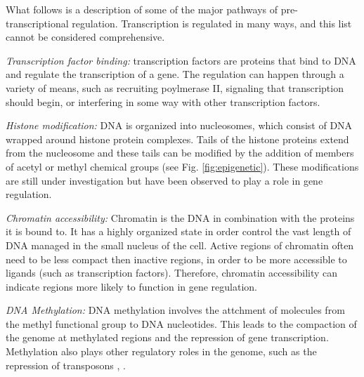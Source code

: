 \documentclass{frontiersENG} %
\begin{document}
\begin{tcolorbox}[title=Box 1 | Pathways of Pre-Transcriptional Regulation]
  \setlength{\parskip}{.5em}
  \label{box:regpathways}

  What follows is a description of some of the major pathways of
  pre-transcriptional regulation. Transcription is regulated in many
  ways, and this list cannot be considered comprehensive.

  \textit{Transcription factor binding:} transcription factors are
  proteins that bind to DNA and regulate the transcription of a
  gene. The regulation can happen through a variety of means, such as
  recruiting poylmerase II, signaling that transcription should begin,
  or interfering in some way with other transcription factors. \par

  \textit{Histone modification:} DNA is organized into nucleosomes,
  which consist of DNA wrapped around histone protein complexes. Tails
  of the histone proteins extend from the nucleosome and these tails
  can be modified by the addition of members of acetyl or methyl
  chemical groups (see Fig. \ref{fig:epigenetic}). These modifications
  are still under investigation but have been observed to play a role
  in gene regulation. \par

  \textit{Chromatin accessibility:} Chromatin is the DNA in
  combination with the proteins it is bound to. It has a highly
  organized state in order control the vast length of DNA managed in
  the small nucleus of the cell. Active regions of chromatin often
  need to be less compact then inactive regions, in order to be more
  accessible to ligands (such as transcription factors). Therefore,
  chromatin accessibility can indicate regions more likely to
  function in gene regulation. \par

  \textit{DNA Methylation:} DNA methylation involves the attchment of
  molecules from the methyl functional group to DNA nucleotides. This
  leads to the compaction of the genome at methylated regions and the
  repression of gene transcription. Methylation also plays other
  regulatory roles in the genome, such as the repression of
  transposons \cite{Espada2010}, \cite{Robertson2000}.\par
\end{tcolorbox}
\end{document}
